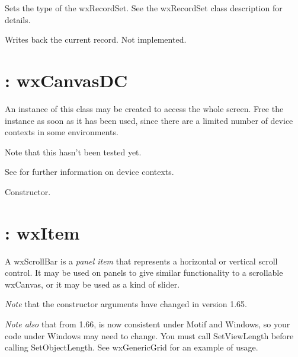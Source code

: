 

Sets the type of the wxRecordSet. See the wxRecordSet class description for details.



Writes back the current record. Not implemented.



\section{: wxCanvasDC}\label{wxscreendc}

An instance of this class may be created to access the whole screen.
Free the instance as soon as it has been used, since there are a limited
number of device contexts in some environments.

Note that this hasn't been tested yet.

See  for further information on device contexts.



Constructor.

\section{: wxItem}\label{wxscrollbar}

A wxScrollBar is a {\it panel item} that represents a horizontal or
vertical scroll control. It may be used on panels to give similar functionality
to a scrollable wxCanvas, or it may be used as a kind of slider.

{\it Note} that the constructor arguments have changed in version 1.65.

{\it Note also} that from 1.66,  is
now consistent under Motif and Windows, so your code under Windows may need to change.
You must call SetViewLength before calling SetObjectLength. See wxGenericGrid for an example of usage.

\label{wxscrollbarconstr}


